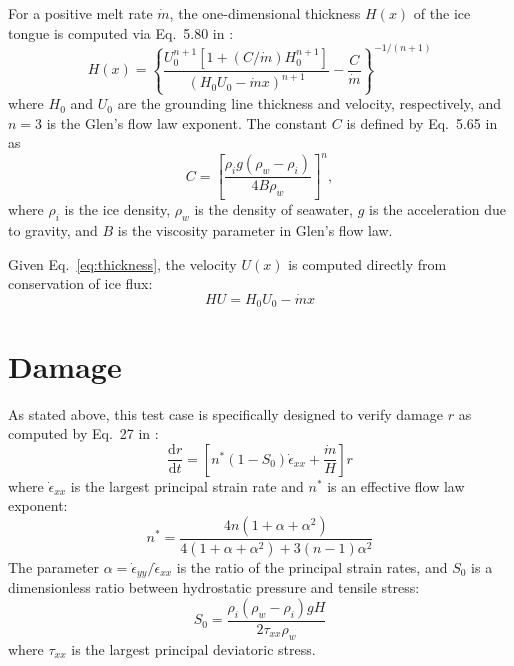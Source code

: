 \documentclass{article}
\begin{document}
For a positive melt rate $\dot{m}$, the one-dimensional thickness $H\left(x\right)$ of the ice tongue is computed via Eq.~5.80 in \citet{van-der-Veen}:
\begin{equation}
   H\left(x\right) = \left\{\frac{U_0^{n+1}\left[1+\left(C/\dot{m}\right)H_0^{n+1}\right]}{\left(H_0U_0 - \dot{m}x\right)^{n+1}} - \frac{C}{\dot{m}}\right\}^{-1/\left(n+1\right)}
   \label{eq:thickness}
\end{equation}
where $H_0$ and $U_0$ are the grounding line thickness and velocity, respectively, and $n=3$ is the Glen's flow law exponent. The constant $C$ is defined by Eq.~5.65 in \citet{van-der-Veen} as
\begin{equation}
   C = \left[\frac{\rho_ig\left(\rho_w-\rho_i\right)}{4B\rho_w}\right]^n,
   \label{eq:C-constant}
\end{equation}
where $\rho_i$ is the ice density, $\rho_w$ is the density of seawater, $g$ is the acceleration due to gravity, and $B$ is the viscosity parameter in Glen's flow law.

Given Eq.~\ref{eq:thickness}, the velocity $U\left(x\right)$ is computed directly from conservation of ice flux:
\begin{equation}
   HU = H_0U_0 - \dot{m}x
   \label{eq:conservation-of-flux}
\end{equation}

\section{Damage}

As stated above, this test case is specifically designed to verify damage $r$ as computed by Eq.~27 in \citet{Bassis-Ma}:
\begin{equation}
   \frac{\mathrm{d}r}{\mathrm{d}t} = \left[n^* \left(1-S_0\right) \dot{\epsilon}_{xx} + \frac{\dot{m}}{H}\right] r
   \label{eq:bassis-ma-damage}
\end{equation}
where $\dot{\epsilon}_{xx}$ is the largest principal strain rate and $n^*$ is an effective flow law exponent:
\begin{equation}
   n^* = \frac{4n\left(1+\alpha+\alpha^2\right)}{4\left(1+\alpha+\alpha^2\right) + 3\left(n-1\right)\alpha^2}
   \label{eq:nstar}
\end{equation}
The parameter $\alpha = \dot{\epsilon}_{yy}/\dot{\epsilon}_{xx}$ is the ratio of the principal strain rates, and $S_0$ is a dimensionless ratio between hydrostatic pressure and tensile stress:
\begin{equation}
   S_0 = \frac{\rho_i \left(\rho_w-\rho_i\right)gH}{2\tau_{xx}\rho_w}
   \label{eq:szero}
\end{equation}
where $\tau_{xx}$ is the largest principal deviatoric stress.
\end{document}
